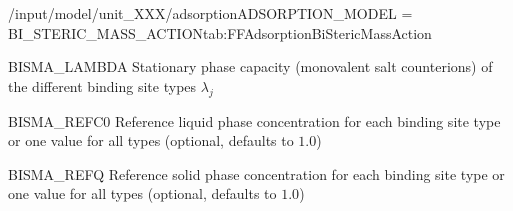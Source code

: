 \begin{condsubgroup}{/input/model/unit\_XXX/adsorption}{ADSORPTION\_MODEL = BI\_STERIC\_MASS\_ACTION}{tab:FFAdsorptionBiStericMassAction}
\begin{dataset}[unit=\si{\mol\per\cubic\metre\of{SP}}, type = double, range={$\geq 0.0$}, length={\texttt{NSTATES}}]{BISMA\_LAMBDA}
    Stationary phase capacity (monovalent salt counterions) of the different binding site types $\lambda_j$
  \end{dataset}
  \begin{dataset}[unit=\si{\mol\per\raiseto{3}\metre\of{MP}}, type = double, range={$> 0$}, length={$\{1,\texttt{NSTATES}\}$}]{BISMA\_REFC0} 
    Reference liquid phase concentration for each binding site type or one value for all types (optional, defaults to $1.0$)
  \end{dataset} 
  \begin{dataset}[unit=\si{\mol\per\raiseto{3}\metre\of{SP}}, type = double, range={$> 0$}, length={$\{1,\texttt{NSTATES}\}$}]{BISMA\_REFQ} 
    Reference solid phase concentration for each binding site type or one value for all types (optional, defaults to $1.0$)
  \end{dataset} 
\end{condsubgroup}

